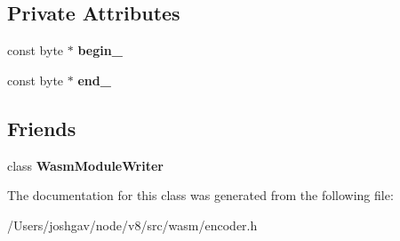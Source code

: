 \subsection*{Private Attributes}
\begin{DoxyCompactItemize}
\item 
const byte $\ast$ {\bfseries begin\+\_\+}\hypertarget{classv8_1_1internal_1_1wasm_1_1_wasm_module_index_ac9ad2f2a24f9bd4fdea31d949dd91add}{}\label{classv8_1_1internal_1_1wasm_1_1_wasm_module_index_ac9ad2f2a24f9bd4fdea31d949dd91add}

\item 
const byte $\ast$ {\bfseries end\+\_\+}\hypertarget{classv8_1_1internal_1_1wasm_1_1_wasm_module_index_a88773ddcd9dd781627524f663ef2ac2d}{}\label{classv8_1_1internal_1_1wasm_1_1_wasm_module_index_a88773ddcd9dd781627524f663ef2ac2d}

\end{DoxyCompactItemize}
\subsection*{Friends}
\begin{DoxyCompactItemize}
\item 
class {\bfseries Wasm\+Module\+Writer}\hypertarget{classv8_1_1internal_1_1wasm_1_1_wasm_module_index_aebd5e6e7da2c2370889f607958488418}{}\label{classv8_1_1internal_1_1wasm_1_1_wasm_module_index_aebd5e6e7da2c2370889f607958488418}

\end{DoxyCompactItemize}


The documentation for this class was generated from the following file\+:\begin{DoxyCompactItemize}
\item 
/\+Users/joshgav/node/v8/src/wasm/encoder.\+h\end{DoxyCompactItemize}
